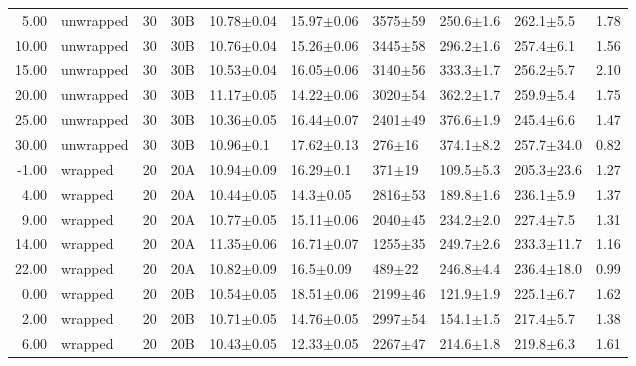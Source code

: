 \begin{tabular}{rlrllllllr}
      5.00 &     unwrapped &      30 &     30B &       10.78$\pm$0.04 &   15.97$\pm$0.06 &  3575$\pm$59 &   250.6$\pm$1.6 &   262.1$\pm$5.5 &        1.78 \\
     10.00 &     unwrapped &      30 &     30B &       10.76$\pm$0.04 &   15.26$\pm$0.06 &  3445$\pm$58 &   296.2$\pm$1.6 &   257.4$\pm$6.1 &        1.56 \\
     15.00 &     unwrapped &      30 &     30B &       10.53$\pm$0.04 &   16.05$\pm$0.06 &  3140$\pm$56 &   333.3$\pm$1.7 &   256.2$\pm$5.7 &        2.10 \\
     20.00 &     unwrapped &      30 &     30B &       11.17$\pm$0.05 &   14.22$\pm$0.06 &  3020$\pm$54 &   362.2$\pm$1.7 &   259.9$\pm$5.4 &        1.75 \\
     25.00 &     unwrapped &      30 &     30B &       10.36$\pm$0.05 &   16.44$\pm$0.07 &  2401$\pm$49 &   376.6$\pm$1.9 &   245.4$\pm$6.6 &        1.47 \\
     30.00 &     unwrapped &      30 &     30B &        10.96$\pm$0.1 &   17.62$\pm$0.13 &   276$\pm$16 &   374.1$\pm$8.2 &  257.7$\pm$34.0 &        0.82 \\
     -1.00 &       wrapped &      20 &     20A &       10.94$\pm$0.09 &    16.29$\pm$0.1 &   371$\pm$19 &   109.5$\pm$5.3 &  205.3$\pm$23.6 &        1.27 \\
      4.00 &       wrapped &      20 &     20A &       10.44$\pm$0.05 &    14.3$\pm$0.05 &  2816$\pm$53 &   189.8$\pm$1.6 &   236.1$\pm$5.9 &        1.37 \\
      9.00 &       wrapped &      20 &     20A &       10.77$\pm$0.05 &   15.11$\pm$0.06 &  2040$\pm$45 &   234.2$\pm$2.0 &   227.4$\pm$7.5 &        1.31 \\
     14.00 &       wrapped &      20 &     20A &       11.35$\pm$0.06 &   16.71$\pm$0.07 &  1255$\pm$35 &   249.7$\pm$2.6 &  233.3$\pm$11.7 &        1.16 \\
     22.00 &       wrapped &      20 &     20A &       10.82$\pm$0.09 &    16.5$\pm$0.09 &   489$\pm$22 &   246.8$\pm$4.4 &  236.4$\pm$18.0 &        0.99 \\
      0.00 &       wrapped &      20 &     20B &       10.54$\pm$0.05 &   18.51$\pm$0.06 &  2199$\pm$46 &   121.9$\pm$1.9 &   225.1$\pm$6.7 &        1.62 \\
      2.00 &       wrapped &      20 &     20B &       10.71$\pm$0.05 &   14.76$\pm$0.05 &  2997$\pm$54 &   154.1$\pm$1.5 &   217.4$\pm$5.7 &        1.38 \\
      6.00 &       wrapped &      20 &     20B &       10.43$\pm$0.05 &   12.33$\pm$0.05 &  2267$\pm$47 &   214.6$\pm$1.8 &   219.8$\pm$6.3 &        1.61 \\

\end{tabular}
